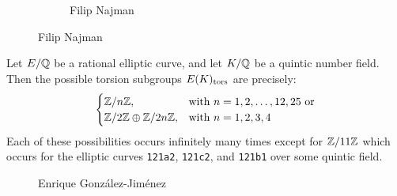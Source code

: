 \begin{frame}[plain]
\begin{figure}[h]
\begin{subfigure}{0.20\textwidth}
	\end{subfigure} \quad
	\begin{subfigure}{0.20\textwidth}
	\captionsetup{labelformat=empty}
	\centering
	\caption{\tiny Filip Najman}
	\end{subfigure}
	\end{figure}
\end{frame}



\begin{frame}[plain]
\begin{thm}
Let $E/\mathbb{Q}$ be a rational elliptic curve, and let $K/\mathbb{Q}$ be a quintic number field. Then the possible torsion subgroups $E(K)_{\text{tors}}$ are precisely:
	\[
	\begin{cases}
	\mathbb{Z}/n\mathbb{Z}, & \text{with } n= 1, 2, \ldots, 12, 25 \text{ or} \\
	\mathbb{Z}/2\mathbb{Z} \oplus \mathbb{Z}/2n\mathbb{Z}, & \text{with } n= 1, 2, 3, 4
	\end{cases}
	\]
Each of these possibilities occurs infinitely many times except for $\mathbb{Z}/11\mathbb{Z}$ which occurs for the elliptic curves \texttt{121a2}, \texttt{121c2}, and \texttt{121b1} over some quintic field. 
\end{thm}
	\begin{figure}[!ht]
	\centering
	\captionsetup{labelformat=empty}
	\caption{Enrique Gonz\'alez-Jim\'enez}
	\end{figure}
\end{frame}




